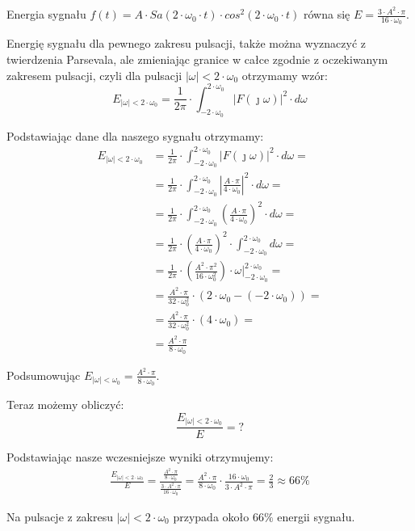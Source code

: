 \begin{task}
Energia sygnału $f(t)=A \cdot Sa\left(2 \cdot \omega_0 \cdot t\right) \cdot cos^2\left(2 \cdot \omega_0 \cdot t\right)$ równa się $E=\frac{3 \cdot A^2 \cdot \pi}{16 \cdot \omega_0}$.

Energię sygnału dla pewnego zakresu pulsacji, także można wyznaczyć z twierdzenia Parsevala, ale zmieniając granice w całce zgodnie z oczekiwanym zakresem pulsacji, czyli dla pulsacji $\left| \omega \right| < 2 \cdot \omega_0$ otrzymamy wzór:
\begin{equation}
E_{\left| \omega \right| < 2 \cdot \omega_0} = \frac{1}{2\pi} \cdot \int_{-2 \cdot \omega_0}^{2 \cdot \omega_0} \left|F(\jmath \omega)\right|^2 \cdot d\omega
\end{equation}

Podstawiając dane dla naszego sygnału otrzymamy:
\begin{align*}
E_{\left| \omega \right| < 2 \cdot \omega_0} &= \frac{1}{2\pi} \cdot \int_{-2 \cdot \omega_0}^{2 \cdot \omega_0} \left|F(\jmath \omega)\right|^2 \cdot d\omega=\\
&= \frac{1}{2\pi} \cdot \int_{-2 \cdot \omega_0}^{2 \cdot \omega_0} \left|\frac{A \cdot \pi}{4 \cdot \omega_0}\right|^2 \cdot d\omega=\\
&= \frac{1}{2\pi} \cdot \int_{-2 \cdot \omega_0}^{2 \cdot \omega_0} \left(\frac{A \cdot \pi}{4 \cdot \omega_0}\right)^2 \cdot d\omega=\\
&= \frac{1}{2\pi} \cdot \left(\frac{A \cdot \pi}{4 \cdot \omega_0}\right)^2 \cdot \int_{-2 \cdot \omega_0}^{2 \cdot \omega_0} d\omega=\\
&= \frac{1}{2\pi} \cdot \left(\frac{A^2 \cdot \pi^2}{16 \cdot \omega_0^2}\right) \cdot \left.\omega\right|_{-2 \cdot \omega_0}^{2 \cdot \omega_0}=\\
&= \frac{A^2 \cdot \pi}{32 \cdot \omega_0^2} \cdot (2 \cdot \omega_0 - (-2 \cdot \omega_0))=\\
&= \frac{A^2 \cdot \pi}{32 \cdot \omega_0^2} \cdot (4 \cdot \omega_0)=\\
&= \frac{A^2 \cdot \pi}{8 \cdot \omega_0}
\end{align*}

Podsumowując $ E_{\left| \omega \right| < \omega_0} = \frac{A^2 \cdot \pi}{8 \cdot \omega_0}$.

Teraz możemy obliczyć:
\begin{equation}
\frac{E_{\left| \omega \right| < 2 \cdot \omega_0}}{E} = ?
\end{equation}

Podstawiając nasze wczesniejsze wyniki otrzymujemy:
\begin{align*}
\frac{E_{\left| \omega \right| < 2 \cdot \omega_0}}{E} = \frac{\frac{A^2 \cdot \pi}{8 \cdot \omega_0}}{\frac{3 \cdot A^2 \cdot \pi}{16 \cdot \omega_0}} =\frac{A^2 \cdot \pi}{8 \cdot \omega_0} \cdot \frac{16 \cdot \omega_0}{3 \cdot A^2 \cdot \pi} =\frac{2}{3} \approx 66\%
\end{align*}

Na pulsacje z zakresu $\left| \omega \right| < 2 \cdot \omega_0$ przypada około $66\%$ energii sygnału.

\end{task}

